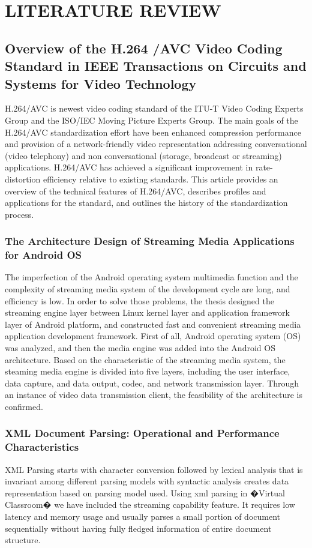 \chapter{LITERATURE REVIEW}

\section{Overview of the H.264 \slash AVC Video Coding Standard in IEEE Transactions on Circuits and Systems for Video Technology}
H.264\slash AVC is newest video coding standard of the ITU-T Video Coding Experts Group and the ISO\slash IEC Moving Picture Experts Group. The main goals of the H.264\slash AVC standardization effort have been enhanced compression performance and provision of a network-friendly video representation addressing conversational (video telephony) and non conversational (storage, broadcast or streaming) applications. H.264\slash AVC has achieved a significant improvement in rate-distortion efficiency relative to existing standards. This article provides an overview of the technical features of H.264\slash AVC, describes profiles and applications for the standard, and outlines the history of the standardization process.  \cite{wiegand2003overview}

\subsection{The Architecture Design of Streaming Media Applications for Android OS}
The imperfection of the Android operating system multimedia function and the complexity of streaming media system of the development cycle are long, and efficiency is low. In order to solve those problems, the thesis designed the streaming engine layer between Linux kernel layer and application framework layer of Android platform, and constructed fast and convenient streaming media application development framework. First of all, Android operating system (OS) was analyzed, and then the media engine was added into the Android OS architecture. Based on the characteristic of the streaming media system, the steaming media engine is divided into five layers, including the user interface, data capture, and data output, codec, and network transmission layer. Through an instance of video data transmission client, the feasibility of the architecture is confirmed.\cite{zhao2012architecture}

\subsection{XML Document Parsing: Operational and Performance Characteristics}
XML Parsing starts with character conversion followed by lexical analysis that is invariant among different parsing models with syntactic analysis creates data representation based on parsing model used. Using xml parsing in �Virtual Classroom� we have included the streaming capability feature. It requires low latency and memory usage and usually parses a small portion of document sequentially without having fully fledged information of entire document structure. \cite{lam2008xml}


